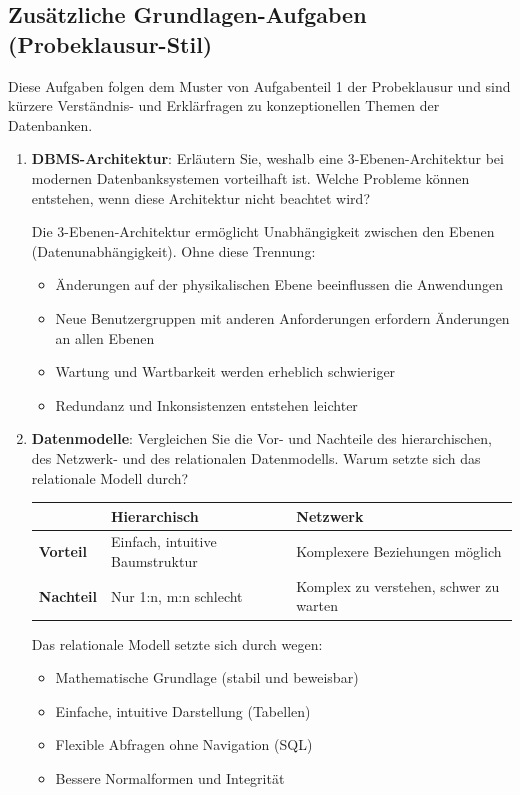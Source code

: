 \documentclass[a4paper]{article}
\begin{document}
\subsection*{Zusätzliche Grundlagen-Aufgaben (Probeklausur-Stil)}

Diese Aufgaben folgen dem Muster von Aufgabenteil 1 der Probeklausur und sind kürzere Verständnis- und 
Erklärfragen zu konzeptionellen Themen der Datenbanken.

\begin{enumerate}
    \item \textbf{DBMS-Architektur}: Erläutern Sie, weshalb eine 3-Ebenen-Architektur bei modernen 
    Datenbanksystemen vorteilhaft ist. Welche Probleme können entstehen, wenn diese Architektur nicht beachtet wird?
    
    Die 3-Ebenen-Architektur ermöglicht Unabhängigkeit zwischen den Ebenen (Datenunabhängigkeit). 
    Ohne diese Trennung:
    \begin{itemize}
        \item Änderungen auf der physikalischen Ebene beeinflussen die Anwendungen
        \item Neue Benutzergruppen mit anderen Anforderungen erfordern Änderungen an allen Ebenen
        \item Wartung und Wartbarkeit werden erheblich schwieriger
        \item Redundanz und Inkonsistenzen entstehen leichter
    \end{itemize}
    
    \item \textbf{Datenmodelle}: Vergleichen Sie die Vor- und Nachteile des hierarchischen, des Netzwerk- 
    und des relationalen Datenmodells. Warum setzte sich das relationale Modell durch?
    
    \begin{tabular}{|l|l|l|}
    \hline
    & \textbf{Hierarchisch} & \textbf{Netzwerk} \\
    \hline
    \textbf{Vorteil} & Einfach, intuitive Baumstruktur & Komplexere Beziehungen möglich \\
    \textbf{Nachteil} & Nur 1:n, m:n schlecht & Komplex zu verstehen, schwer zu warten \\
    \hline
    \end{tabular}
    
    Das relationale Modell setzte sich durch wegen:
    \begin{itemize}
        \item Mathematische Grundlage (stabil und beweisbar)
        \item Einfache, intuitive Darstellung (Tabellen)
        \item Flexible Abfragen ohne Navigation (SQL)
        \item Bessere Normalformen und Integrität
    \end{itemize}
    

\end{enumerate}
\end{document}
